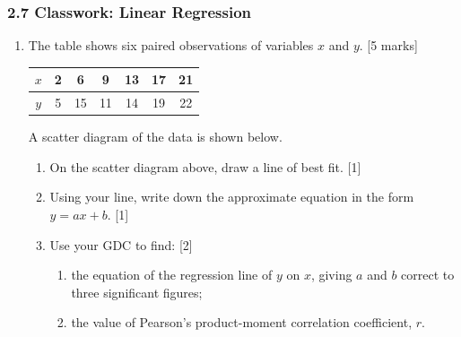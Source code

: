 \documentclass[12pt, twoside]{article}
\begin{document}
\subsubsection*{2.7 Classwork: Linear Regression}
\begin{enumerate}[itemsep=0.1cm]

\item The table shows six paired observations of variables $x$ and $y$. \hfill [5 marks]

\begin{center}
\begin{tabular}{|c|cccccc|}
  \hline
  $x$ & 2 & 6 & 9 & 13 & 17 & 21 \\
  \hline
  $y$ & 5 & 15 & 11 & 14 & 19 & 22 \\
  \hline
\end{tabular}
\end{center}

A scatter diagram of the data is shown below.

\begin{center}
\end{center}

\begin{enumerate}[itemsep=0.25cm]
  \item On the scatter diagram above, draw a line of best fit. \hfill [1]

  \item Using your line, write down the approximate equation in the form $y = ax + b$. \hfill [1]

  \vspace{1.2cm}

  \item Use your GDC to find: \hfill [2]
  \begin{enumerate}[label=(\roman*), itemsep=0.5cm]
    \item the equation of the regression line of $y$ on $x$, giving $a$ and $b$ correct to
    three significant figures;
    \item the value of Pearson's product-moment correlation coefficient, $r$.
  \end{enumerate}


\end{enumerate}
\end{enumerate}
\end{document}
